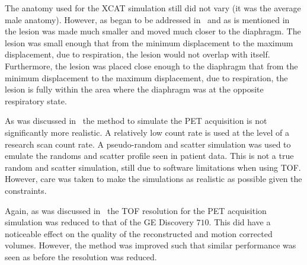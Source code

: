         The anatomy used for the \gls{XCAT} simulation still did not vary (it was the average male anatomy). However, as began to be addressed in~ and as is mentioned in~ the lesion was made much smaller and moved much closer to the diaphragm. The lesion was small enough that from the minimum displacement to the maximum displacement, due to respiration, the lesion would not overlap with itself. Furthermore, the lesion was placed close enough to the diaphragm that from the minimum displacement to the maximum displacement, due to respiration, the lesion is fully within the area where the diaphragm was at the opposite respiratory state.

        As was discussed in~ the method to simulate the \gls{PET} acquisition is not significantly more realistic. A relatively low count rate is used at the level of a research scan count rate. A pseudo-random and scatter simulation was used to emulate the randoms and scatter profile seen in patient data. This is not a true random and scatter simulation, still due to software limitations when using \gls{TOF}. However, care was taken to make the simulations as realistic as possible given the constraints.

        Again, as was discussed in~ the \gls{TOF} resolution for the \gls{PET} acquisition simulation was reduced to that of the \gls{GE} Discovery $710$. This did have a noticeable effect on the quality of the reconstructed and motion corrected volumes. However, the method was improved such that similar performance was seen as before the resolution was reduced.

